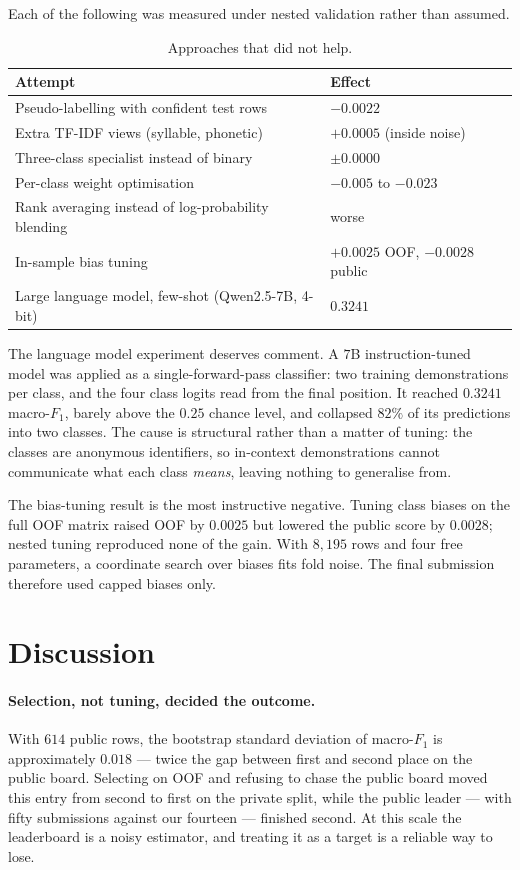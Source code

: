 \documentclass[11pt,a4paper]{article}
\begin{document}
Each of the following was measured under nested validation rather than assumed.

\begin{table}[h]
\centering
\caption{Approaches that did not help.}
\small
\begin{tabular}{ll}
\toprule
Attempt & Effect \\
\midrule
Pseudo-labelling with confident test rows & $-0.0022$ \\
Extra TF-IDF views (syllable, phonetic) & $+0.0005$ (inside noise) \\
Three-class specialist instead of binary & $\pm 0.0000$ \\
Per-class weight optimisation & $-0.005$ to $-0.023$ \\
Rank averaging instead of log-probability blending & worse \\
In-sample bias tuning & $+0.0025$ OOF, $-0.0028$ public \\
Large language model, few-shot (Qwen2.5-7B, 4-bit) & $0.3241$ \\
\bottomrule
\end{tabular}
\end{table}

The language model experiment deserves comment. A $7$B instruction-tuned model was applied as a
single-forward-pass classifier: two training demonstrations per class, and the four class logits read
from the final position. It reached $0.3241$ macro-$F_1$, barely above the $0.25$ chance level, and
collapsed $82\%$ of its predictions into two classes. The cause is structural rather than a matter of
tuning: the classes are anonymous identifiers, so in-context demonstrations cannot communicate what
each class \emph{means}, leaving nothing to generalise from.

The bias-tuning result is the most instructive negative. Tuning class biases on the full OOF matrix
raised OOF by $0.0025$ but lowered the public score by $0.0028$; nested tuning reproduced none of the
gain. With $8{,}195$ rows and four free parameters, a coordinate search over biases fits fold noise.
The final submission therefore used capped biases only.

\section{Discussion}

\paragraph{Selection, not tuning, decided the outcome.}
With $614$ public rows, the bootstrap standard deviation of macro-$F_1$ is approximately $0.018$
--- twice the gap between first and second place on the public board. Selecting on OOF and refusing to
chase the public board moved this entry from second to first on the private split, while the public
leader --- with fifty submissions against our fourteen --- finished second. At this scale the
leaderboard is a noisy estimator, and treating it as a target is a reliable way to lose.
\end{document}
